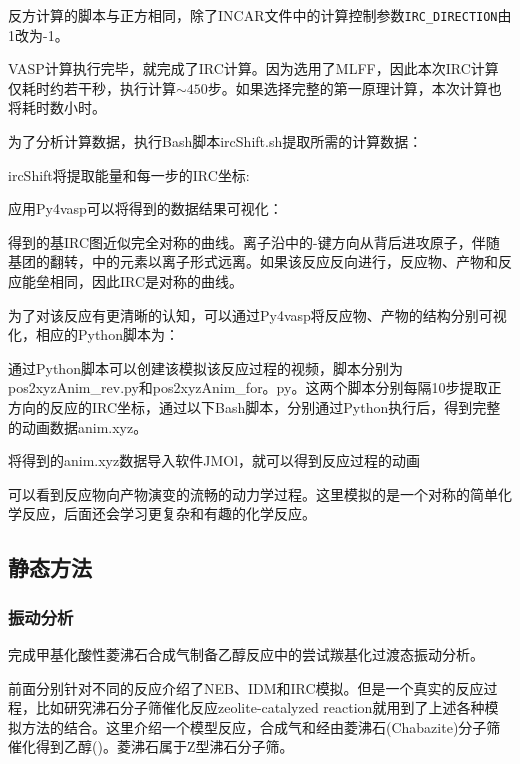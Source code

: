 反方计算的脚本与正方相同，除了\textrm{INCAR}文件中的计算控制参数\texttt{IRC\_DIRECTION}由\textrm{1}改为\textrm{-1}。

\textrm{VASP}计算执行完毕，就完成了\textrm{IRC}计算。因为选用了\textrm{MLFF}，因此本次\textrm{IRC}计算仅耗时约若干秒，执行计算$\sim 450$步。如果选择完整的第一原理计算，本次计算也将耗时数小时。

为了分析计算数据，执行\textrm{Bash}脚本\textrm{ircShift.sh}提取所需的计算数据：

\textrm{ircShift}将提取能量和每一步的\textrm{IRC}坐标:

应用\textrm{Py4vasp}可以将得到的数据结果可视化：

得到的基\textrm{IRC}图近似完全对称的曲线。离子沿中的-键方向从背后进攻原子，伴随基团的翻转，中的元素以离子形式远离。如果该反应反向进行，反应物、产物和反应能垒相同，因此\textrm{IRC}是对称的曲线。

为了对该反应有更清晰的认知，可以通过\textrm{Py4vasp}将反应物、产物的结构分别可视化，相应的\textrm{Python}脚本为：

通过\textrm{Python}脚本可以创建该模拟该反应过程的视频，脚本分别为\textrm{pos2xyzAnim\_rev.py}和\textrm{pos2xyzAnim\_for。py}。这两个脚本分别每隔10步提取正方向的反应的\textrm{IRC}坐标，通过以下\textrm{Bash}脚本，分别通过\textrm{Python}执行后，得到完整的动画数据\textrm{anim.xyz}。

将得到的\textrm{anim.xyz}数据导入软件\textrm{JMOl}，就可以得到反应过程的动画

可以看到反应物向产物演变的流畅的动力学过程。这里模拟的是一个对称的简单化学反应，后面还会学习更复杂和有趣的化学反应。

\subsection{静态方法}
\subsubsection{振动分析}
完成甲基化酸性菱沸石合成气制备乙醇反应中的尝试羰基化过渡态振动分析。

前面分别针对不同的反应介绍了\textrm{NEB}、\textrm{IDM}和\textrm{IRC}模拟。但是一个真实的反应过程，比如研究沸石分子筛催化反应\textrm{zeolite-catalyzed reaction}就用到了上述各种模拟方法的结合。这里介绍一个模型反应，合成气\textrm{和}经由菱沸石\textrm{(Chabazite)}分子筛催化得到乙醇()。菱沸石属于\textrm{Z}型沸石分子筛。

